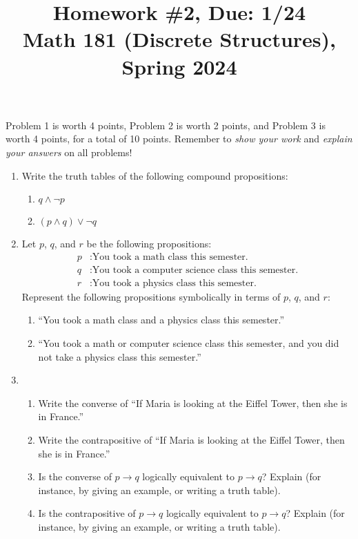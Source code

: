 \documentclass[11pt]{article}
\title{Homework \#2, Due: 1/24 \\Math 181 (Discrete Structures), Spring 2024}
\date{}
\begin{document}
\maketitle

\thispagestyle{empty}

\vspace{-1cm}

Problem 1 is worth 4 points, Problem 2 is worth 2 points, and Problem 3 is worth 4 points, for a total of 10 points. Remember to \emph{show your work} and \emph{explain your answers} on all problems!

\begin{enumerate}
\item Write the truth tables of the following compound propositions:
\begin{enumerate}
\item $q \wedge \neg p$
\item $(p \wedge q) \vee \neg q$
\end{enumerate}

\item Let $p$, $q$, and $r$ be the following propositions:
\begin{align*}
p &: \textrm{You took a math class this semester.} \\
q &: \textrm{You took a computer science class this semester.} \\
r &: \textrm{You took a physics class this semester.}
\end{align*}
Represent the following propositions symbolically in terms of $p$, $q$, and $r$:
\begin{enumerate}
\item ``You took a math class and a physics class this semester.''
\item ``You took a math or computer science class this semester, and you did not take a physics class this semester.''
\end{enumerate}

\item \begin{enumerate}
\item Write the converse of ``If Maria is looking at the Eiffel Tower, then she is in France.''
\item Write the contrapositive of ``If Maria is looking at the Eiffel Tower, then she is in France.''
\item Is the converse of $p \to q$ logically equivalent to $p \to q$? Explain (for instance, by giving an example, or writing a truth table).
\item Is the contrapositive of $p \to q$ logically equivalent to $p \to q$? Explain (for instance, by giving an example, or writing a truth table).
\end{enumerate}
\end{enumerate}
\end{document}
